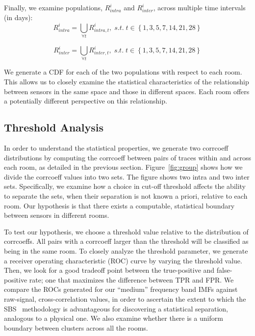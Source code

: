 Finally, we examine populations, $R^i_{intra}$ and $R^i_{inter}$, across multiple time intervals (in days):%
\begin{displaymath}
R^{i}_{intra} = \bigcup_{\forall t}^{} R^i_{intra, t}, \; s.t. \; t \in \left \{ 1,3,5,7,14,21,28\right \}
\end{displaymath}

\begin{displaymath}
R^{i}_{inter} = \bigcup_{\forall t}^{} R^i_{inter, t}, \; s.t. \; t \in \left \{  1,3,5,7,14,21,28\right \}
\end{displaymath}

We generate a CDF for each of the two populations with respect to each room.  
This allows us to closely examine the statistical characteristics 
of the relationship between sensors in the same space and those in different spaces.  Each room offers a potentially different 
perspective on this relationship.


\subsection{Threshold Analysis}
In order to understand the statistical properties, we generate two corrcoeff distributions by computing the corrcoeff between pairs of traces within and across each room, as detailed in the previous section.
Figure~\ref{fig:group} shows how we divide the corrcoeff values into two sets.
The figure shows two intra and two inter sets. Specifically, we examine how a choice in cut-off threshold affects the ability
to separate the sets, when their separation is not known a priori, relative to each room.
Our hypothesis is that there exists a computable, statistical boundary between sensors in different rooms.

To test our hypothesis, we choose a threshold value relative to the distribution of corrcoeffs.  
All pairs with a corrcoeff larger than the threshold will be classified as being in the same room.  To closely analyze the threshold parameter, 
we generate a receiver operating characteristic (ROC) curve by varying the threshold value.  Then, we look for a good tradeoff point between the true-positive and false-positive rate; one that maximizes the difference between TPR and FPR.  We compare the ROCs generated 
for our ``medium'' frequency band IMFs against raw-signal, cross-correlation values, in order to ascertain the extent to which 
the SBS~\cite{SBS} methodology is advantageous for discovering a statistical separation, analogous to a physical one.
We also examine whether there is a uniform boundary between clusters across all the rooms. 



